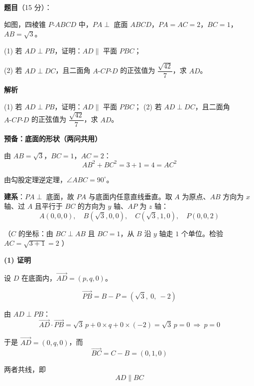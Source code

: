 \begin{answer}

\textbf{题目}（15 分）：

如图，四棱锥 $P\text{-}ABCD$ 中，$PA\perp$ 底面 $ABCD$，$PA=AC=2$，$BC=1$，$AB=\sqrt3$。
\nopagebreak[4]
\begin{center}\end{center}
\nopagebreak[4]
  (1) 若 $AD\perp PB$，证明：$AD\parallel$ 平面 $PBC$；

  (2) 若 $AD\perp DC$，且二面角 $A\text{-}CP\text{-}D$ 的正弦值为 $\dfrac{\sqrt{42}}{7}$，求 $AD$。

\textbf{解析}

  (1) 若 $AD\perp PB$，证明：$AD\parallel$ 平面 $PBC$；
  (2) 若 $AD\perp DC$，且二面角 $A\text{-}CP\text{-}D$ 的正弦值为 $\dfrac{\sqrt{42}}7$，求 $AD$。

\par\medskip

\textbf{预备：底面的形状（两问共用）}

由 $AB=\sqrt3$，$BC=1$，$AC=2$：
\nopagebreak[4]
\[AB^{2}+BC^{2}=3+1=4=AC^{2}\]

由勾股定理逆定理，$\angle ABC=90^{\circ}$。

\textbf{建系}：$PA\perp$ 底面，故 $PA$ 与底面内任意直线垂直。取 $A$ 为原点、$AB$ 方向为 $x$ 轴、过 $A$ 且平行于 $BC$ 的方向为 $y$ 轴、$AP$ 为 $z$ 轴：
\nopagebreak[4]
\[A(0,0,0),\quad B\left(\sqrt3,0,0\right),\quad C\left(\sqrt3,1,0\right),\quad P(0,0,2)\]

（$C$ 的坐标：由 $BC\perp AB$ 且 $BC=1$，从 $B$ 沿 $y$ 轴走 $1$ 个单位。检验 $AC=\sqrt{3+1}=2$ ）

\par\medskip

\textbf{(1) 证明}

设 $D$ 在底面内，$\overrightarrow{AD}=(p,q,0)$。

\nopagebreak[4]
\[\overrightarrow{PB}=B-P=\left(\sqrt3,\ 0,\ -2\right)\]

由 $AD\perp PB$：
\nopagebreak[4]
\[\overrightarrow{AD}\cdot\overrightarrow{PB}=\sqrt3\,p+0\times q+0\times(-2)=\sqrt3\,p=0\ \Longrightarrow\ p=0\]

于是 $\overrightarrow{AD}=(0,q,0)$，而
\nopagebreak[4]
\[\overrightarrow{BC}=C-B=(0,1,0)\]

两者共线，即
\nopagebreak[4]
\[AD\parallel BC\]


\end{answer}
